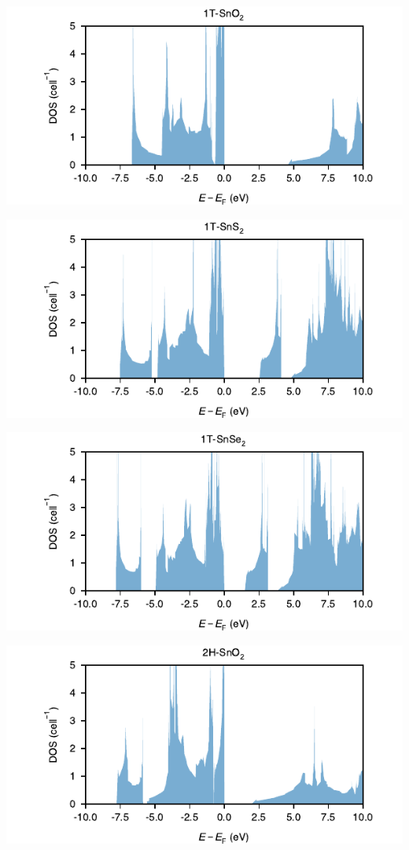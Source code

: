 \begin{center}
\includegraphics[width=.9\linewidth]{img/SI_figs/1T-SnO2-DOS.pdf}
\end{center}
\begin{center}
\includegraphics[width=.9\linewidth]{img/SI_figs/1T-SnS2-DOS.pdf}
\end{center}
\begin{center}
\includegraphics[width=.9\linewidth]{img/SI_figs/1T-SnSe2-DOS.pdf}
\end{center}
\begin{center}
\includegraphics[width=.9\linewidth]{img/SI_figs/2H-SnO2-DOS.pdf}
\end{center}

